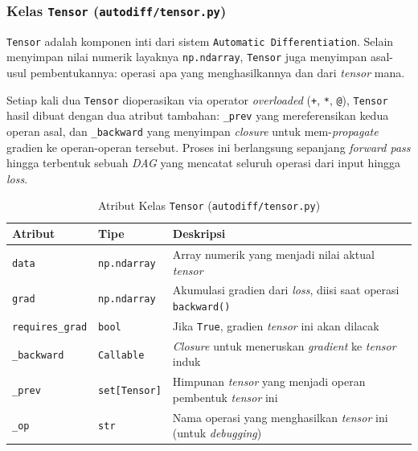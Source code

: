 \subsubsection{Kelas \texttt{Tensor} (\texttt{autodiff/tensor.py})}

\texttt{Tensor} adalah komponen inti dari sistem \texttt{Automatic Differentiation}. Selain menyimpan nilai numerik layaknya \texttt{np.ndarray}, \texttt{Tensor} juga menyimpan asal-usul pembentukannya: operasi apa yang menghasilkannya dan dari \textit{tensor} mana.

Setiap kali dua \texttt{Tensor} dioperasikan via operator \textit{overloaded} (\texttt{+}, \texttt{*}, \texttt{@}), \texttt{Tensor} hasil dibuat dengan dua atribut tambahan: \texttt{\_prev} yang mereferensikan kedua operan asal, dan \texttt{\_backward} yang menyimpan \textit{closure} untuk mem-\textit{propagate} gradien ke operan-operan tersebut. Proses ini berlangsung sepanjang \textit{forward pass} hingga terbentuk sebuah \textit{DAG} yang mencatat seluruh operasi dari input hingga \textit{loss}.

\begin{table}[H]
    \centering
    \caption{Atribut Kelas \texttt{Tensor} (\texttt{autodiff/tensor.py})}
    \begin{tabular}{lll}
        \toprule
        \textbf{Atribut} & \textbf{Tipe} & \textbf{Deskripsi} \\
        \midrule
        \texttt{data} & \texttt{np.ndarray} & Array numerik yang menjadi nilai aktual \textit{tensor} \\
        \texttt{grad} & \texttt{np.ndarray} & Akumulasi gradien dari \textit{loss}, diisi saat operasi \texttt{backward()} \\
        \texttt{requires\_grad} & \texttt{bool} & Jika \texttt{True}, gradien \textit{tensor} ini akan dilacak \\
        \texttt{\_backward} & \texttt{Callable} & \textit{Closure} untuk meneruskan \textit{gradient} ke \textit{tensor} induk \\
        \texttt{\_prev} & \texttt{set[Tensor]} & Himpunan \textit{tensor} yang menjadi operan pembentuk \textit{tensor} ini \\
        \texttt{\_op} & \texttt{str} & Nama operasi yang menghasilkan \textit{tensor} ini (untuk \textit{debugging}) \\
        \bottomrule
    \end{tabular}
    \label{tab:tensor-attr}
\end{table}

